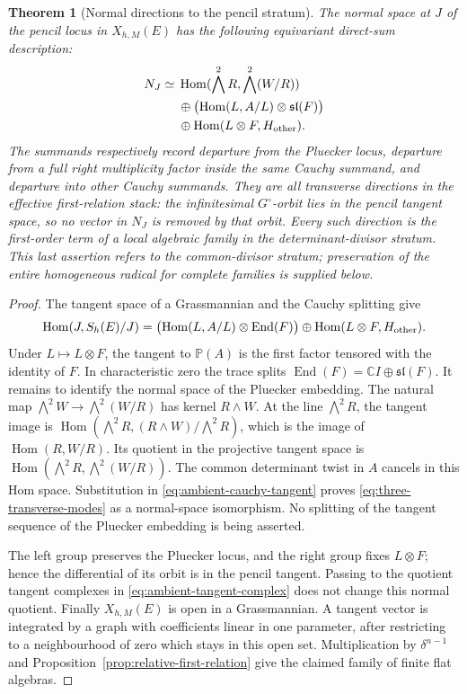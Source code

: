 \documentclass[11pt,reqno]{amsart}
\numberwithin{equation}{section}
\newtheorem{theorem}{Theorem}[section]
\theoremstyle{definition}\newtheorem{definition}[theorem]{Definition}
\theoremstyle{remark}\newtheorem{remark}[theorem]{Remark}
\newcommand{\C}{\mathbb C}\newcommand{\Q}{\mathbb Q}
\newcommand{\Pj}{\mathbb P}\newcommand{\A}{\mathbb A}
\DeclareMathOperator{\Hom}{Hom}\DeclareMathOperator{\Tot}{Tot}
\DeclareMathOperator{\End}{End}
\begin{document}
\begin{theorem}[Normal directions to the pencil stratum]
\label{thm:transverse-pencil-directions}
The normal space at \(J\) of the pencil locus in \(X_{h,M}(E)\)
has the following equivariant direct-sum description:
\begin{equation}\label{eq:three-transverse-modes}
 \begin{split}
 N_J\simeq{}&
 \Hom(\bigwedge^2R,\bigwedge^2(W/R))\\
 &\oplus\bigl(\Hom(L,A/L)\otimes\mathfrak{sl}(F)\bigr)\\
 &\oplus\Hom(L\otimes F,H_{\rm other}).
 \end{split}
\end{equation}
The summands respectively record departure from the Pluecker locus,
departure from a full right multiplicity factor inside the same
Cauchy summand, and departure into other Cauchy summands.  They are
all transverse directions in the effective first-relation stack:
the infinitesimal \(G^\circ\)-orbit lies in the pencil tangent
space, so no vector in \(N_J\) is removed by that orbit.  Every
such direction is the first-order term of a local algebraic family
in the determinant-divisor stratum.  This last assertion refers to
the common-divisor stratum; preservation of the entire homogeneous
radical for complete families is supplied below.
\end{theorem}
\begin{proof}
The tangent space of a Grassmannian and the Cauchy splitting give
\begin{equation}\label{eq:ambient-cauchy-tangent}
 \Hom(J,S_h(E)/J)=
 \bigl(\Hom(L,A/L)\otimes\End(F)\bigr)
       \oplus\Hom(L\otimes F,H_{\rm other}).
\end{equation}
Under \(L\mapsto L\otimes F\), the tangent to \(\Pj(A)\) is the
first factor tensored with the identity of \(F\).
In characteristic zero the trace splits
\(\End(F)=\C I\oplus\mathfrak{sl}(F)\).
It remains to identify the normal space of the Pluecker embedding.
The natural map
\(\bigwedge^2W\to\bigwedge^2(W/R)\) has kernel \(R\wedge W\).
At the line \(\bigwedge^2R\), the tangent image is
\(\Hom(\bigwedge^2R,(R\wedge W)/\bigwedge^2R)\), which is the
image of \(\Hom(R,W/R)\).  Its quotient in the projective tangent
space is
\(\Hom(\bigwedge^2R,\bigwedge^2(W/R))\).
The common determinant twist in \(A\) cancels in this Hom space.
Substitution in \eqref{eq:ambient-cauchy-tangent} proves
\eqref{eq:three-transverse-modes} as a normal-space isomorphism.
No splitting of the tangent sequence of the Pluecker embedding is
being asserted.

The left group preserves the Pluecker locus, and the right group
fixes \(L\otimes F\); hence the differential of its orbit is in
the pencil tangent.  Passing to the quotient tangent complexes in
\eqref{eq:ambient-tangent-complex} does not change this normal
quotient.  Finally \(X_{h,M}(E)\) is open in a Grassmannian.  A
tangent vector is integrated by a graph with coefficients linear
in one parameter, after restricting to a neighbourhood of zero
which stays in this open set.  Multiplication by \(\delta^{n-1}\)
and Proposition~\ref{prop:relative-first-relation} give the claimed
family of finite flat algebras.
\end{proof}
\end{document}
